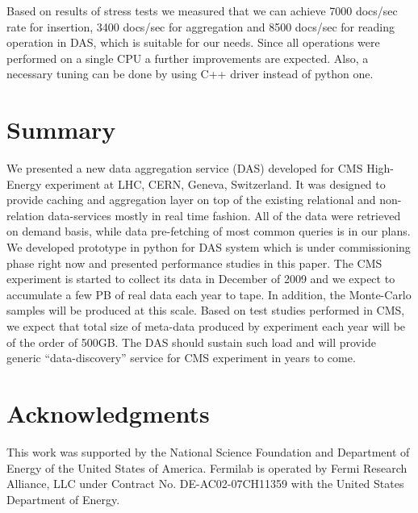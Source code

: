 \documentclass[1p,times]{elsarticle}
\begin{document}
Based on results of stress tests we measured that we can achieve 7000 docs/sec rate
for insertion, 3400 docs/sec for aggregation and 8500 docs/sec for reading operation
in DAS, which is suitable for our needs. Since all operations were performed 
on a single CPU a further improvements are expected. Also, a necessary
tuning can be done by using C++ driver instead of python one.

\section{Summary}
We presented a new data aggregation service (DAS) developed for CMS High-Energy experiment
at LHC, CERN, Geneva, Switzerland. It was designed to provide caching and
aggregation layer on top of the existing relational and non-relation data-services
mostly in real time fashion. All of the data were retrieved on demand basis,
while data pre-fetching of most common queries is in our plans. We developed
prototype in python for DAS system which is under commissioning phase right now 
and presented performance studies in this paper. 
The CMS experiment is started to collect its data in December of 2009 and 
we expect to accumulate a few PB of real data each year to tape. 
In addition, the Monte-Carlo samples will be produced at this scale.
Based on test studies performed in CMS, we expect that total size of
meta-data produced by experiment each year will be of the order of
500GB. The DAS should sustain such load and will provide generic 
``data-discovery'' service for CMS experiment in years to come.

\section{Acknowledgments}

This work was supported by the National Science Foundation and 
Department of Energy of the United States of America. 
Fermilab is operated by Fermi Research Alliance, LLC under Contract
No. DE-AC02-07CH11359 with the United States Department of Energy.



%
%

\end{document}
